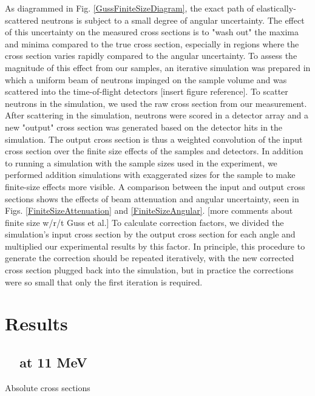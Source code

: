 As diagrammed in Fig. \ref{GussFiniteSizeDiagram}, the exact
path of elastically-scattered neutrons is subject to a small degree of angular
uncertainty. The effect of this uncertainty on the measured cross
sections is to "wash out" the maxima and minima compared to the true cross
section, especially in regions where the cross section varies rapidly compared
to the angular uncertainty. To assess the magnitude of this effect from our
samples, an iterative simulation was prepared in which a uniform beam of neutrons
impinged on the sample volume and was scattered into the time-of-flight
detectors [insert figure reference]. To scatter neutrons
in the simulation, we used the raw cross section from our measurement. After
scattering in the simulation, neutrons were scored in a detector array and a new "output"
cross section was generated based on the detector hits in the simulation. The
output cross section is thus a weighted convolution of the input cross section
over the finite size effects of the samples and detectors. In addition to
running a simulation with the sample sizes used in the experiment, we performed
addition simulations with exaggerated sizes for the
sample to make finite-size effects more visible. A comparison between the input
and output cross sections shows the effects of beam attenuation and angular
uncertainty, seen in Figs. \ref{FiniteSizeAttenuation} and \ref{FiniteSizeAngular}.
[more comments about finite size w/r/t Guss et al.]
To calculate correction factors, we divided the simulation's
input cross section by the output cross section for each angle and multiplied our
experimental results by this factor. In principle, this procedure to generate
the correction should be repeated iteratively, with the new corrected cross
section plugged back into the simulation, but in practice the corrections were so small
that only the first iteration is required.

\section{Results}
\subsection{\snTwelveFour\ \el\ at 11 MeV}
Absolute cross sections 

